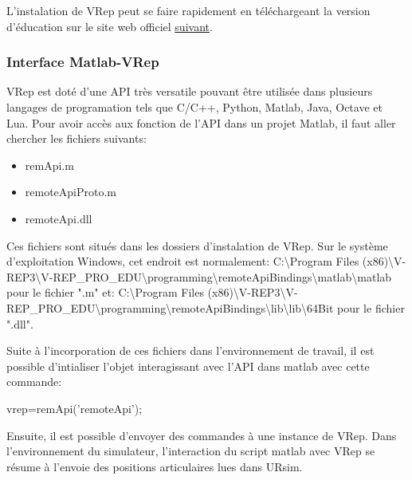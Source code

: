 L'instalation de VRep peut se faire rapidement en téléchargeant la version d'éducation sur le site web officiel \href{http://www.coppeliarobotics.com/downloads.html}{suivant}.

\subsubsection{Interface Matlab-VRep}

VRep est doté d'une API très versatile pouvant être utilisée dans plusieurs langages de programation tels que C/C++, Python, Matlab, Java, Octave et Lua.
Pour avoir accès aux fonction de l'API dans un projet Matlab, il faut aller chercher les fichiers suivants:
\begin{itemize}
\item remApi.m
\item remoteApiProto.m
\item remoteApi.dll
\end{itemize}

Ces fichiers sont situés dans les dossiers d'instalation de VRep.
Sur le système d'exploitation Windows, cet endroit est normalement: 
\newline
C:\textbackslash Program Files (x86)\textbackslash V-REP3\textbackslash V-REP\_PRO\_EDU\textbackslash programming\textbackslash remoteApiBindings\textbackslash matlab\textbackslash matlab
\newline
\newline
pour le fichier ".m" et:
\newline
\newline
C:\textbackslash Program Files (x86)\textbackslash V-REP3\textbackslash V-REP\_PRO\_EDU\textbackslash programming\textbackslash remoteApiBindings\textbackslash lib\textbackslash lib\textbackslash 64Bit
\newline
\newline
pour le fichier ".dll".
\newline

Suite à l'incorporation de ces fichiers dans l'environnement de travail, il est possible d'intialiser l'objet interagissant avec l'API dans matlab avec cette commande:
\newline

vrep=remApi('remoteApi');
\newline

Ensuite, il est possible d'envoyer des commandes à une instance de VRep.
Dans l'environnement du simulateur, l'interaction du script matlab avec VRep se résume à l'envoie des positions articulaires lues dans URsim.


\newpage